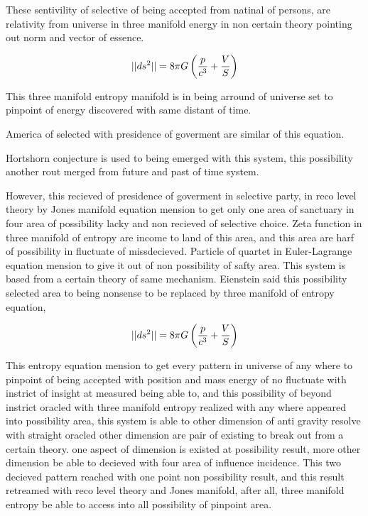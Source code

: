 \documentclass{jsarticle}
\begin{document}
{   These sentivility of selective of being accepted from natinal of persons,
   are relativity from universe in three manifold energy in non certain
   theory pointing out norm and vector of essence.

   $$ ||ds^2|| = 8 \pi G\left({p \over c^3} + {V \over S}\right) $$

   This three manifold entropy manifold is in being arround of universe set 
   to pinpoint of energy discovered with same distant of time.

   America of selected with presidence of goverment are similar of this
   equation.

   Hortshorn conjecture is used to being emerged with this system, 
   this possibility another rout merged from future and past of time system.

   However, this recieved of presidence of goverment in selective party,
   in reco level theory by Jones manifold equation mension to get
   only one area of sanctuary in four area of possibility lacky and non
   recieved of selective choice.
   Zeta function in three manifold of entropy are income to land of this area,
   and this area are harf of possibility in fluctuate of missdecieved.
   Particle of quartet in Euler-Lagrange equation mension to give it out of
   non possibility of safty area. This system is based from a certain theory
   of same mechanism.
   Eienstein said this possibility selected area to being nonsense
   to be replaced by three manifold of entropy equation,


   $$ ||ds^2|| = 8 \pi G\left({p \over c^3} + {V \over S}\right) $$

   This entropy equation mension to get every pattern in universe of any where
   to pinpoint of being accepted with position and mass energy of no fluctuate
   with instrict of insight at measured being able to, and this possibility
   of beyond instrict oracled with three manifold entropy realized with
   any where appeared into possibility area, this system is able to 
   other dimension of anti gravity resolve with straight oracled 
   other dimension are pair of existing to break out from a certain theory.
   one aspect of dimension is existed at possibility result,
   more other dimension be able to decieved with four area of influence
   incidence. This two decieved pattern reached with one point non possibility
   result, and this result retreamed with reco level theory and 
   Jones manifold, after all, three manifold entropy be able to access into all 
   possibility of pinpoint area.

}
\end{document}
